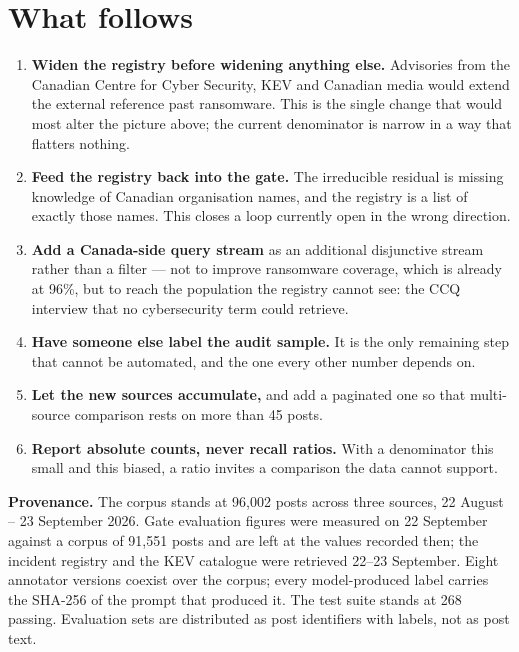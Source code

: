 \documentclass[11pt]{article}
\begin{document}
\section{What follows}

\begin{enumerate}[leftmargin=1.4em,itemsep=3pt]
\item \textbf{Widen the registry before widening anything else.} Advisories
from the Canadian Centre for Cyber Security, KEV and Canadian media would
extend the external reference past ransomware. This is the single change that
would most alter the picture above; the current denominator is narrow in a way
that flatters nothing.
\item \textbf{Feed the registry back into the gate.} The irreducible residual
is missing knowledge of Canadian organisation names, and the registry is a list
of exactly those names. This closes a loop currently open in the wrong
direction.
\item \textbf{Add a Canada-side query stream} as an additional disjunctive
stream rather than a filter --- not to improve ransomware coverage, which is
already at 96\%, but to reach the population the registry cannot see: the CCQ
interview that no cybersecurity term could retrieve.
\item \textbf{Have someone else label the audit sample.} It is the only
remaining step that cannot be automated, and the one every other number depends
on.
\item \textbf{Let the new sources accumulate,} and add a paginated one so that
multi-source comparison rests on more than 45 posts.
\item \textbf{Report absolute counts, never recall ratios.} With a denominator
this small and this biased, a ratio invites a comparison the data cannot
support.
\end{enumerate}

\vfill
\begin{plainbox}
\footnotesize
\textbf{Provenance.} The corpus stands at 96{,}002 posts across three sources,
22 August -- 23 September 2026. Gate evaluation figures were measured on 22
September against a corpus of 91{,}551 posts and are left at the values
recorded then; the incident registry and the KEV catalogue were retrieved
22--23 September. Eight annotator versions coexist over the corpus; every
model-produced label carries the SHA-256 of the prompt that produced it. The
test suite stands at 268 passing. Evaluation sets are distributed as post
identifiers with labels, not as post text.
\end{plainbox}
\end{document}
